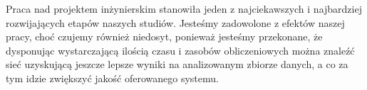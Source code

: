 \documentclass[polish,12pt]{aghthesis}
\begin{document}
Praca nad projektem inżynierskim stanowiła jeden z najciekawszych i najbardziej rozwijających etapów naszych studiów. Jesteśmy zadowolone z efektów naszej pracy, choć czujemy również niedosyt, ponieważ jesteśmy przekonane, że dysponując wystarczającą ilością czasu i zasobów obliczeniowych można znaleźć sieć uzyskującą jeszcze lepsze wyniki na analizowanym zbiorze danych, a co za tym idzie zwiększyć jakość oferowanego systemu.

\newpage


\end{document}
